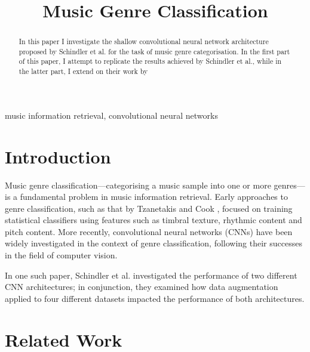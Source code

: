 \documentclass[conference]{IEEEtran}
\begin{document}
\title{Music Genre Classification}

\author{
}

\maketitle

\begin{abstract}
In this paper I investigate the shallow convolutional neural network architecture proposed by Schindler et al. \cite{SchindlerLidyRauber} for the task of music genre categorisation.
In the first part of this paper, I attempt to replicate the results achieved by Schindler et al., while in the latter part, I extend on their work by 
\end{abstract}

\begin{IEEEkeywords}
music information retrieval, convolutional neural networks
\end{IEEEkeywords}

\section{Introduction}

Music genre classification---categorising a music sample into one or more genres---is a fundamental problem in music information retrieval.
Early approaches to genre classification, such as that by Tzanetakis and Cook \cite{TzanetakisCook}, focused on training statistical classifiers using features such as timbral texture, rhythmic content and pitch content.
More recently, convolutional neural networks (CNNs) have been widely investigated in the context of genre classification, following their successes in the field of computer vision.

In one such paper, Schindler et al. \cite{SchindlerLidyRauber} investigated the performance of two different CNN architectures; in conjunction, they examined how data augmentation applied to four different datasets impacted the performance of both architectures.

\section{Related Work}
\end{document}
